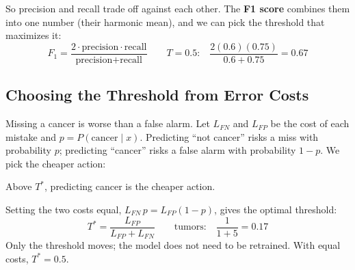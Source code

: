\begin{keeptogether}
So precision and recall trade off against each other. The \textbf{F1 score} combines them into one number (their harmonic mean), and we can pick the threshold that maximizes it:
\[
F_1 = \frac{2 \cdot \text{precision} \cdot \text{recall}}{\text{precision} + \text{recall}}
\qquad T = 0.5\text{:} \quad \frac{2(0.6)(0.75)}{0.6 + 0.75} = 0.67
\]
\end{keeptogether}

\subsection*{Choosing the Threshold from Error Costs}
\begin{keeptogether}
Missing a cancer is worse than a false alarm. Let $L_{FN}$ and $L_{FP}$ be the cost of each mistake and $p = P(\text{cancer} \mid x)$. Predicting ``not cancer'' risks a miss with probability $p$; predicting ``cancer'' risks a false alarm with probability $1 - p$. We pick the cheaper action:

{\centering
{}
\par}
{\centering\scriptsize Above $T^*$, predicting cancer is the cheaper action.\par}
\end{keeptogether}

\begin{keeptogether}
Setting the two costs equal, $L_{FN}\,p = L_{FP}(1 - p)$, gives the optimal threshold:
\[
T^* = \frac{L_{FP}}{L_{FP} + L_{FN}} \qquad \text{tumors:} \quad \frac{1}{1 + 5} = 0.17
\]
Only the threshold moves; the model does not need to be retrained. With equal costs, $T^* = 0.5$.
\end{keeptogether}

